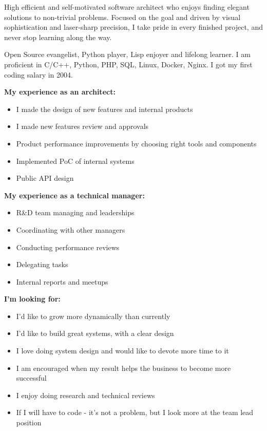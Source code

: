 
\begin{cvparagraph}

High efficient and self-motivated software architect who enjoys finding elegant
solutions to non-trivial problems. Focused on the goal and driven by visual
sophistication and laser-sharp precision, I take pride in every finished
project, and never stop learning along the way.

Open Source evangelist, Python player, Lisp enjoyer and lifelong learner.
I am proficient in C/C++, Python, PHP, SQL, Linux, Docker, Nginx. I got my
first coding salary in 2004.

\textbf{My experience as an architect:}

\begin{itemize}
    \item I made the design of new features and internal products
    \item I made new features review and approvals
    \item Product performance improvements by choosing right tools and components
    \item Implemented PoC of internal systems
    \item Public API design
\end{itemize}

\textbf{My experience as a technical manager:}

\begin{itemize}
    \item R\&D team managing and leaderships
    \item Coordinating with other managers
    \item Conducting performance reviews
    \item Delegating tasks
    \item Internal reports and meetups
\end{itemize}

\textbf{I'm looking for:}

\begin{itemize}
    \item I'd like to grow more dynamically than currently
    \item I'd like  to build great systems, with a clear design
    \item I love doing system design and would like to devote more time to it
    \item I am encouraged when my result helps the business to become more successful
    \item I enjoy doing research and technical reviews
    \item If I will have to code - it's not a problem, but I look more at the team lead position
\end{itemize}

\end{cvparagraph}
